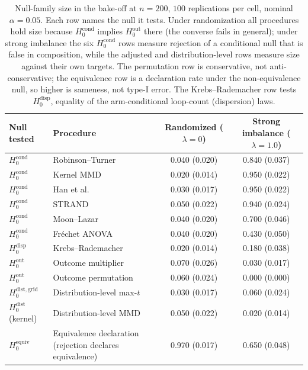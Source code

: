 \begin{table}[H]
\centering
\small
\setlength{\tabcolsep}{3pt}
\begin{tabular}{>{\raggedright\arraybackslash}p{2.0cm}>{\raggedright\arraybackslash}p{5.6cm}cc}
\toprule
Null tested & Procedure & Randomized ($\lambda=0$) & Strong imbalance ($\lambda=1.0$) \\
\midrule
$H_0^{\mathrm{cond}}$ & Robinson--Turner & 0.040 (0.020) & 0.840 (0.037) \\
$H_0^{\mathrm{cond}}$ & Kernel MMD & 0.020 (0.014) & 0.950 (0.022) \\
$H_0^{\mathrm{cond}}$ & Han et al. & 0.030 (0.017) & 0.950 (0.022) \\
$H_0^{\mathrm{cond}}$ & STRAND & 0.050 (0.022) & 0.940 (0.024) \\
$H_0^{\mathrm{cond}}$ & Moon--Lazar & 0.040 (0.020) & 0.700 (0.046) \\
$H_0^{\mathrm{cond}}$ & Fr\'echet ANOVA & 0.040 (0.020) & 0.430 (0.050) \\
\midrule
$H_0^{\mathrm{disp}}$ & Krebs--Rademacher & 0.020 (0.014) & 0.180 (0.038) \\
\midrule
$H_0^{\mathrm{out}}$ & Outcome multiplier & 0.070 (0.026) & 0.030 (0.017) \\
$H_0^{\mathrm{out}}$ & Outcome permutation & 0.060 (0.024) & 0.000 (0.000) \\
$H_0^{\mathrm{dist,grid}}$ & Distribution-level max-$t$ & 0.030 (0.017) & 0.060 (0.024) \\
$H_0^{\mathrm{dist}}$ (kernel) & Distribution-level MMD & 0.050 (0.022) & 0.020 (0.014) \\
\midrule
$H_0^{\mathrm{equiv}}$ & Equivalence declaration (rejection declares equivalence) & 0.970 (0.017) & 0.650 (0.048) \\
\bottomrule
\end{tabular}
\caption{Null-family size in the bake-off at $n=200$, $100$ replications per cell, nominal $\alpha=0.05$. Each row names the null it tests. Under randomization all procedures hold size because $H_0^{\mathrm{cond}}$ implies $H_0^{\mathrm{out}}$ there (the converse fails in general); under strong imbalance the six $H_0^{\mathrm{cond}}$ rows measure rejection of a conditional null that is false in composition, while the adjusted and distribution-level rows measure size against their own targets. The permutation row is conservative, not anti-conservative; the equivalence row is a declaration rate under the non-equivalence null, so higher is sameness, not type-I error. The Krebs--Rademacher row tests $H_0^{\mathrm{disp}}$, equality of the arm-conditional loop-count (dispersion) laws.}
\label{tab:bakeoff-size}
\end{table}
